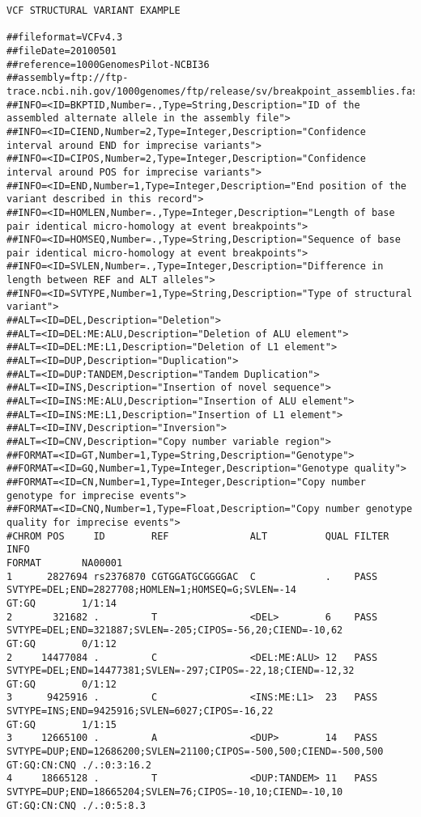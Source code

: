 \documentclass[8pt]{article}
\begin{document}
\pagebreak
\footnotesize
\begin{landscape}
\begin{verbatim}
VCF STRUCTURAL VARIANT EXAMPLE

##fileformat=VCFv4.3
##fileDate=20100501
##reference=1000GenomesPilot-NCBI36
##assembly=ftp://ftp-trace.ncbi.nih.gov/1000genomes/ftp/release/sv/breakpoint_assemblies.fasta
##INFO=<ID=BKPTID,Number=.,Type=String,Description="ID of the assembled alternate allele in the assembly file">
##INFO=<ID=CIEND,Number=2,Type=Integer,Description="Confidence interval around END for imprecise variants">
##INFO=<ID=CIPOS,Number=2,Type=Integer,Description="Confidence interval around POS for imprecise variants">
##INFO=<ID=END,Number=1,Type=Integer,Description="End position of the variant described in this record">
##INFO=<ID=HOMLEN,Number=.,Type=Integer,Description="Length of base pair identical micro-homology at event breakpoints">
##INFO=<ID=HOMSEQ,Number=.,Type=String,Description="Sequence of base pair identical micro-homology at event breakpoints">
##INFO=<ID=SVLEN,Number=.,Type=Integer,Description="Difference in length between REF and ALT alleles">
##INFO=<ID=SVTYPE,Number=1,Type=String,Description="Type of structural variant">
##ALT=<ID=DEL,Description="Deletion">
##ALT=<ID=DEL:ME:ALU,Description="Deletion of ALU element">
##ALT=<ID=DEL:ME:L1,Description="Deletion of L1 element">
##ALT=<ID=DUP,Description="Duplication">
##ALT=<ID=DUP:TANDEM,Description="Tandem Duplication">
##ALT=<ID=INS,Description="Insertion of novel sequence">
##ALT=<ID=INS:ME:ALU,Description="Insertion of ALU element">
##ALT=<ID=INS:ME:L1,Description="Insertion of L1 element">
##ALT=<ID=INV,Description="Inversion">
##ALT=<ID=CNV,Description="Copy number variable region">
##FORMAT=<ID=GT,Number=1,Type=String,Description="Genotype">
##FORMAT=<ID=GQ,Number=1,Type=Integer,Description="Genotype quality">
##FORMAT=<ID=CN,Number=1,Type=Integer,Description="Copy number genotype for imprecise events">
##FORMAT=<ID=CNQ,Number=1,Type=Float,Description="Copy number genotype quality for imprecise events">
#CHROM POS     ID        REF              ALT          QUAL FILTER INFO                                                               FORMAT       NA00001
1      2827694 rs2376870 CGTGGATGCGGGGAC  C            .    PASS   SVTYPE=DEL;END=2827708;HOMLEN=1;HOMSEQ=G;SVLEN=-14                 GT:GQ        1/1:14
2       321682 .         T                <DEL>        6    PASS   SVTYPE=DEL;END=321887;SVLEN=-205;CIPOS=-56,20;CIEND=-10,62         GT:GQ        0/1:12
2     14477084 .         C                <DEL:ME:ALU> 12   PASS   SVTYPE=DEL;END=14477381;SVLEN=-297;CIPOS=-22,18;CIEND=-12,32       GT:GQ        0/1:12
3      9425916 .         C                <INS:ME:L1>  23   PASS   SVTYPE=INS;END=9425916;SVLEN=6027;CIPOS=-16,22                     GT:GQ        1/1:15
3     12665100 .         A                <DUP>        14   PASS   SVTYPE=DUP;END=12686200;SVLEN=21100;CIPOS=-500,500;CIEND=-500,500  GT:GQ:CN:CNQ ./.:0:3:16.2
4     18665128 .         T                <DUP:TANDEM> 11   PASS   SVTYPE=DUP;END=18665204;SVLEN=76;CIPOS=-10,10;CIEND=-10,10         GT:GQ:CN:CNQ ./.:0:5:8.3
\end{verbatim}
\end{landscape}
\pagebreak
\normalsize
\end{document}
